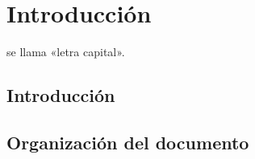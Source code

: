 
\chapter{Introducción}
 se llama «letra capital».
\section{Introducción}
\section{Organización del documento}

